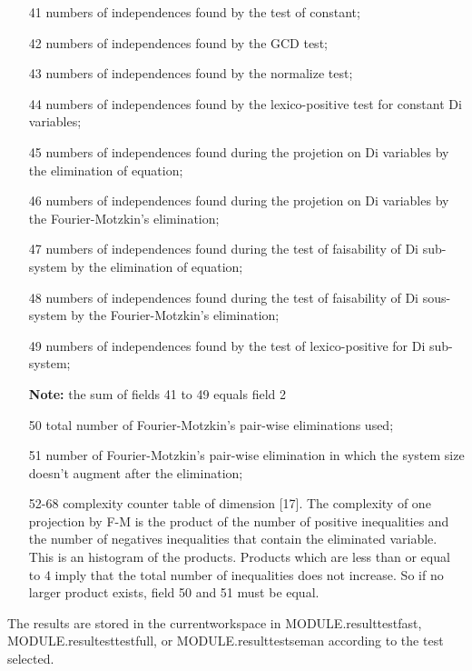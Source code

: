 \begin{itemize}
	{\bf Note:} the fields 26 to 40 must be less than or equal to
	the corresponding fields 11 to 25

  \item[41] numbers of independences found by the test of constant;
  \item[42] numbers of independences found by the GCD test;
  \item[43] numbers of independences found by the normalize test;
  \item[44] numbers of independences found by the lexico-positive test
             for constant Di variables;
  \item[45] numbers of independences found during the projetion on Di
            variables by the elimination of equation;
  \item[46] numbers of independences found during the projetion on Di
            variables by the Fourier-Motzkin's elimination;
  \item[47] numbers of independences found during the test of
            faisability of  Di sub-system by the elimination of equation;
  \item[48] numbers of independences found during the test of
            faisability of Di sous-system by the Fourier-Motzkin's
            elimination; 
  \item[49] numbers of independences found by the test of lexico-positive
            for Di sub-system; 

	{\bf Note:} the sum of fields 41 to 49 equals field 2

  \item[50] total number of Fourier-Motzkin's pair-wise eliminations
	 used; 
  \item[51] number of Fourier-Motzkin's pair-wise elimination 
	in which the system size doesn't augment after the elimination;
  \item[52-68] complexity counter table of dimension [17]. The
               complexity of one projection by F-M is the product of the
               number of positive inequalities and the number of negatives
               inequalities that contain the eliminated variable. This
	is an histogram of the products. Products which are less than 
	or equal to 4
	imply that the total number of inequalities does not increase.
	So if no larger product exists, field 50 and 51 must be equal.
\end{itemize}

The results are stored in the currentworkspace in MODULE.resulttestfast,
MODULE.resultesttestfull, or MODULE.resulttestseman according to the
test selected.

